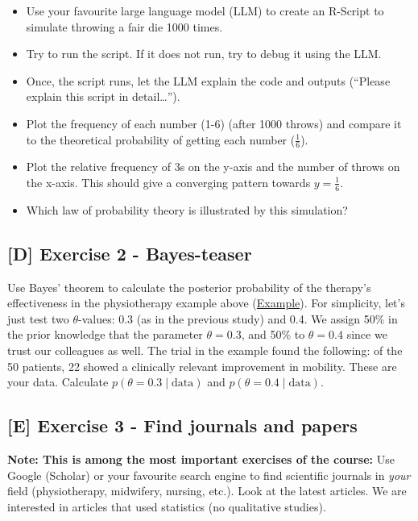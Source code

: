 \documentclass[
]{book}
\providecommand{\tightlist}{%
  \setlength{\itemsep}{0pt}\setlength{\parskip}{0pt}}
\begin{document}
\begin{itemize}
\tightlist
\item
  Use your favourite large language model (LLM) to create an R-Script to simulate throwing a fair die 1000 times.
\item
  Try to run the script. If it does not run, try to debug it using the LLM.
\item
  Once, the script runs, let the LLM explain the code and outputs (``Please explain this script in detail\ldots{}'').
\item
  Plot the frequency of each number (1-6) (after 1000 throws) and compare it to the theoretical probability of getting each number (\(\frac{1}{6}\)).
\item
  Plot the relative frequency of 3s on the y-axis and the number of throws on the x-axis. This should give a converging pattern towards \(y=\frac{1}{6}\).
\item
  Which law of probability theory is illustrated by this simulation?
\end{itemize}

\subsection{{[}D{]} Exercise 2 - Bayes-teaser}\label{exercise2}

Use Bayes' theorem to calculate the posterior probability of the therapy's effectiveness in the physiotherapy example above (\hyperref[example1_physio]{Example}).
For simplicity, let's just test two \(\theta\)-values: 0.3 (as in the previous study) and 0.4. We assign 50\% in the prior knowledge that the parameter
\(\theta=0.3\), and 50\% to \(\theta=0.4\) since we trust our colleagues as well.
The trial in the example found the following: of the 50 patients, 22 showed a clinically relevant improvement in mobility.
These are your data. Calculate \(p(\theta = 0.3 \mid \text{data})\) and \(p(\theta = 0.4 \mid \text{data})\).

\subsection{{[}E{]} Exercise 3 - Find journals and papers}\label{exercise3}

\textbf{Note: This is among the most important exercises of the course:}
Use Google (Scholar) or your favourite search engine to find scientific journals in \emph{your} field (physiotherapy,
midwifery, nursing, etc.).
Look at the latest articles. We are interested in articles that used statistics (no qualitative studies).
\end{document}
